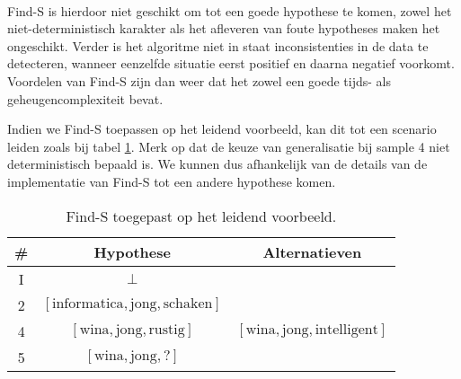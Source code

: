 \paragraph{}
Find-S is hierdoor niet geschikt om tot een goede hypothese te komen, zowel het niet-deterministisch karakter als het afleveren van foute hypotheses maken het ongeschikt. Verder is het algoritme niet in staat inconsistenties in de data te detecteren, wanneer eenzelfde situatie eerst positief en daarna negatief voorkomt. Voordelen van Find-S zijn dan weer dat het zowel een goede tijds-  als geheugencomplexiteit  bevat.
\begin{leftbar}
Indien we Find-S toepassen op het leidend voorbeeld, kan dit tot een scenario leiden zoals bij tabel \ref{tbl:solliciterenFindS}. Merk op dat de keuze van generalisatie bij sample 4 niet deterministisch bepaald is. We kunnen dus afhankelijk van de details van de implementatie van Find-S tot een andere hypothese komen.
\end{leftbar}
\begin{table}[htb]
\centering
\begin{tabular}{c|c|c}
\#&Hypothese&Alternatieven\\
\hline
I&$\perp$\\
2&$\left[\mbox{informatica},\mbox{jong},\mbox{schaken}\right]$&\\
4&$\left[\mbox{wina},\mbox{jong},\mbox{rustig}\right]$&$\left[\mbox{wina},\mbox{jong},\mbox{intelligent}\right]$\\
5&$\left[\mbox{wina},\mbox{jong},\mbox{?}\right]$&
\end{tabular}
\caption{Find-S toegepast op het leidend voorbeeld.}
\label{tbl:solliciterenFindS}
\end{table}
